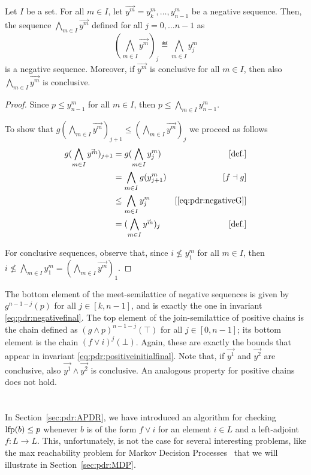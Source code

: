 \begin{lemma}\label{lmm:pdr:meetneg}
	Let $I$ be a set. For all $m \in I$, let $\vec{y^m}=y^m_k, \dots, y^m_{n-1}$ be a negative sequence. Then, the sequence $\bigwedge_{m\in I} \vec{y^m}$ defined for all $j = 0, \dots n-1$ as
	\[
	(\bigwedge_{m\in I} \vec{y^m})_j \eqdef \bigwedge_{m\in I}y^m_{j}
	\]
	is a negative sequence. Moreover, if $\vec{y^m}$ is conclusive for all $m \in I$, then also $\bigwedge_{m\in I} \vec{y^m}$ is conclusive.
\end{lemma}
\begin{proof}
	Since $p \le y^m_{n-1}$ for all $m\in I$, then $p \le \bigwedge_{m\in I}y^m_{n-1} $.

	To show that $g(\bigwedge_{m\in I}\vec{y^m})_{j+1} \le (\bigwedge_{m\in I}\vec{y^m})_{j}$ we proceed as follows
	\begin{align*}
		g(\bigwedge_{m\in I}\vec{y^m})_{j+1} & = g(\bigwedge_{m\in I}y^m_j)        & [\text{def.}]              \\
		                                     & = \bigwedge_{m\in I} g(y^m_{j+1} )  & [f \dashv g]               \\
		                                     & \le \bigwedge_{m\in I} y^m_{j}      & [\eqref{eq:pdr:negativeG}] \\
		                                     & = (\bigwedge_{m\in I}\vec{y^m})_{j} & [\text{def.}]
	\end{align*}

	For conclusive sequences, observe that, since $i \not \le y_1^m$ for all $m \in I$, then $i \not \le \bigwedge_{m\in I}y_1^m = (\bigwedge_{m\in I}\vec{y^m})_{1}$.
\end{proof}

The bottom element of the meet-semilattice of negative sequences is given by $g^{n-1-j}(p)$ for all $j\in [k,n-1]$, and is exactly the one in invariant \eqref{eq:pdr:negativefinal}. The top element of the join-semilattice of positive chains is the chain defined as $(g \land p)^{n-1-j} (\top)$ for all $j\in [0,n-1]$; its bottom element is the chain $(f \lor i)^j (\bot)$. Again, these are exactly the bounds that appear in invariant \eqref{eq:pdr:positiveinitialfinal}.
Note that, if $\vec{y^1}$ and $\vec{y^2}$ are conclusive, also $\vec{y^1} \land \vec{y^2}$ is conclusive. An analogous property for positive chains does not hold.

\section{{\ADPDR}}\label{sec:pdr:downset}
In Section~\ref{sec:pdr:APDR}, we have introduced an algorithm for checking $\text{lfp}(b) \le p$ whenever $b$ is of the form $f \lor i$ for an element $i\in L$ and a left-adjoint $f\colon L \to L$. This, unfortunately, is not the case for several interesting problems, like the max reachability problem for Markov Decision Processes~\cite{BK08} that we will illustrate in Section~\ref{sec:pdr:MDP}.

